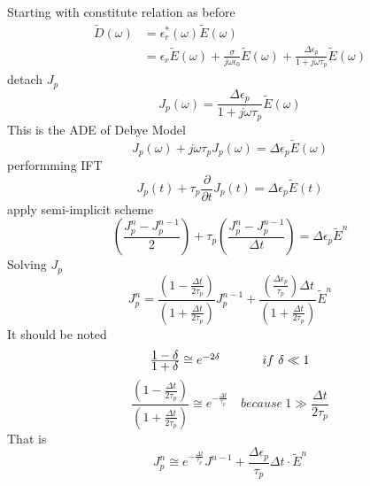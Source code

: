 Starting with constitute relation as before
\begin{equation}
  \begin{split}
    \widetilde{D}(\omega) & = \epsilon_r^*(\omega)\widetilde{E}(\omega)\\
    & = \epsilon_r\widetilde{E}(\omega) + \frac{\sigma}{j\omega\epsilon_0}\widetilde{E}(\omega) + \frac{\Delta \epsilon_p}{1+j\omega \tau_p}\widetilde{E}(\omega)\label{eq:debye_ade_start}
  \end{split}
\end{equation}
detach $J_p$
\begin{equation}
  J_p(\omega) = \frac{\Delta \epsilon_p}{1+j\omega \tau_p}\widetilde{E}(\omega)
\end{equation}
This is the ADE of Debye Model
\begin{equation}
  J_p(\omega) + j\omega\tau_{p}J_p(\omega) = \Delta\epsilon_p\widetilde{E}(\omega)
\end{equation}
performming IFT 
\begin{equation}
  J_p(t) + \tau_p\frac{\partial}{\partial t}J_p(t) = \Delta\epsilon_p\widetilde{E}(t)
\end{equation}
apply semi-implicit scheme
\begin{equation}
  \left( \frac{J_p^n - J_p^{n-1}}{2} \right) + \tau_p \left( \frac{J_p^n - J_p^{n-1}}{\Delta t}\right) = \Delta\epsilon_p\widetilde{E}^n
\end{equation}
Solving $J_p$
\begin{equation}
  J_p^n = \frac{\left(1-\frac{\Delta t}{2\tau_p}\right)}{\left(1+\frac{\Delta t}{2\tau_p}\right)}J_p^{n-1} 
  + \frac{\left(\frac{\Delta\epsilon_p}{\tau_p}\right)\Delta t}{\left(1+\frac{\Delta t}{2\tau_p}\right)}\widetilde{E}^n
\end{equation}
It should be noted
\begin{equation}
  \begin{array}{@{}lp{0.5cm}r@{}}
    \frac{\displaystyle1-\delta}{\displaystyle1+\delta} \cong e^{-2\delta} && if\ \delta \ll 1
  \end{array}
\end{equation}
\begin{equation}
  \frac{\left(1-\frac{\displaystyle\Delta t}{\displaystyle2\tau_p}\right)}{\left(1+\frac{\displaystyle\Delta t}{\displaystyle2\tau_p}\right)} \cong e^{-\frac{\Delta t}{\tau_p}}\quad  because\ 1 \gg \frac{\Delta t}{2\tau_p}
\end{equation}
That is 
\begin{equation}
  J_p^n \cong e^{-\frac{\Delta t}{\tau_p}}J^{n-1} + \frac{\Delta\epsilon_p}{\tau_p}\Delta t\cdot\widetilde{E}^n
\end{equation}
